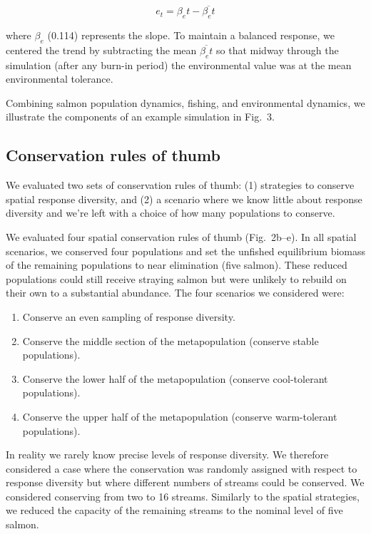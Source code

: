 \[e_t = \beta_e t - \overline{\beta_e t}\]

where $\beta_e$ (0.114) represents the slope. To maintain a balanced response, we centered the trend by subtracting the mean $\overline{\beta_e t}$ so that midway through the simulation (after any burn-in period) the environmental value was at the mean environmental tolerance.

Combining salmon population dynamics, fishing, and environmental dynamics, we illustrate the components of an example simulation in Fig.~3.

\subsection{Conservation rules of thumb}

We evaluated two sets of conservation rules of thumb: (1) strategies to conserve spatial response diversity, and (2) a scenario where we know little about response diversity and we're left with a choice of how many populations to conserve.

We evaluated four spatial conservation rules of thumb (Fig.~2b--e). In all spatial scenarios, we conserved four populations and set the unfished equilibrium biomass of the remaining populations to near elimination (five salmon). These reduced populations could still receive straying salmon but were unlikely to rebuild on their own to a substantial abundance. The four scenarios we considered were:

\begin{enumerate}
\def\labelenumi{\arabic{enumi}.}
\item
  Conserve an even sampling of response diversity.
\item
  Conserve the middle section of the metapopulation (conserve stable populations).
\item
  Conserve the lower half of the metapopulation (conserve cool-tolerant populations).
\item
  Conserve the upper half of the metapopulation (conserve warm-tolerant populations).
\end{enumerate}

In reality we rarely know precise levels of response diversity. We therefore considered a case where the conservation was randomly assigned with respect to response diversity but where different numbers of streams could be conserved. We considered conserving from two to 16 streams. Similarly to the spatial strategies, we reduced the capacity of the remaining streams to the nominal level of five salmon.

